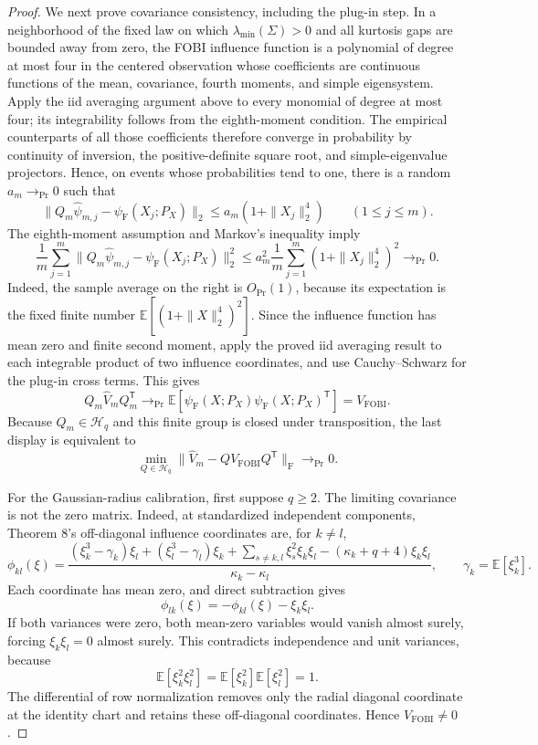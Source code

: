 \documentclass{article}
\begin{document}
\begin{proof}
We next prove covariance consistency, including the plug-in step. In a neighborhood of the fixed law on which \(\lambda_{\min}(\Sigma)>0\) and all kurtosis gaps are bounded away from zero, the FOBI influence function is a polynomial of degree at most four in the centered observation whose coefficients are continuous functions of the mean, covariance, fourth moments, and simple eigensystem. Apply the iid averaging argument above to every monomial of degree at most four; its integrability follows from the eighth-moment condition. The empirical counterparts of all those coefficients therefore converge in probability by continuity of inversion, the positive-definite square root, and simple-eigenvalue projectors. Hence, on events whose probabilities tend to one, there is a random \(a_m\to_{\Pr}0\) such that
\[
 \|Q_m\widehat\psi_{m,j}-\psi_{\mathrm F}(X_j;P_X)\|_2
 \leq a_m(1+\|X_j\|_2^4)
 \qquad(1\leq j\leq m).
\]
The eighth-moment assumption and Markov's inequality imply
\[
 \frac1m\sum_{j=1}^m
 \|Q_m\widehat\psi_{m,j}-\psi_{\mathrm F}(X_j;P_X)\|_2^2
 \leq
 a_m^2\frac1m\sum_{j=1}^m(1+\|X_j\|_2^4)^2
 \longrightarrow_{\Pr}0.
\]
Indeed, the sample average on the right is \(O_{\Pr}(1)\), because its expectation is the fixed finite number \(\mathbb E[(1+\|X\|_2^4)^2]\). Since the influence function has mean zero and finite second moment, apply the proved iid averaging result to each integrable product of two influence coordinates, and use Cauchy--Schwarz for the plug-in cross terms. This gives
\[
 Q_m\widehat V_mQ_m^{\mathsf T}
 \longrightarrow_{\Pr}
 \mathbb E[\psi_{\mathrm F}(X;P_X)\psi_{\mathrm F}(X;P_X)^{\mathsf T}]
 =V_{\mathrm{FOBI}}.
\]
Because \(Q_m\in\mathcal H_q\) and this finite group is closed under transposition, the last display is equivalent to
\[
 \min_{Q\in\mathcal H_q}
 \|\widehat V_m-QV_{\mathrm{FOBI}}Q^{\mathsf T}\|_{\mathrm F}
 \longrightarrow_{\Pr}0.
\]

For the Gaussian-radius calibration, first suppose \(q\geq2\). The limiting covariance is not the zero matrix. Indeed, at standardized independent components, Theorem 8's off-diagonal influence coordinates are, for \(k\neq l\),
\[
 \phi_{kl}(\xi)
 =\frac{
 (\xi_k^3-\gamma_k)\xi_l+(\xi_l^3-\gamma_l)\xi_k
 +\sum_{s\neq k,l}\xi_s^2\xi_k\xi_l
 -(\kappa_k+q+4)\xi_k\xi_l
 }{\kappa_k-\kappa_l},
 \qquad
 \gamma_k=\mathbb E[\xi_k^3].
\]
Each coordinate has mean zero, and direct subtraction gives
\[
 \phi_{lk}(\xi)=-\phi_{kl}(\xi)-\xi_k\xi_l.
\]
If both variances were zero, both mean-zero variables would vanish almost surely, forcing \(\xi_k\xi_l=0\) almost surely. This contradicts independence and unit variances, because
\[
 \mathbb E[\xi_k^2\xi_l^2]
 =\mathbb E[\xi_k^2]\mathbb E[\xi_l^2]=1.
\]
The differential of row normalization removes only the radial diagonal coordinate at the identity chart and retains these off-diagonal coordinates. Hence \(V_{\mathrm{FOBI}}\neq0\).


\end{proof}
\end{document}
